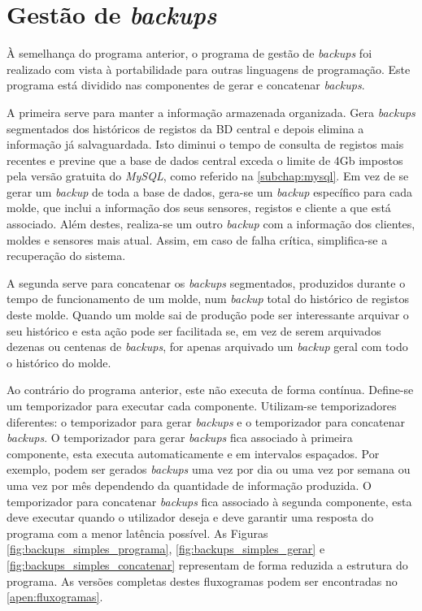 \documentclass[11pt,twoside,a4paper]{report}
\begin{document}
\section{Gestão de \textit{backups}}
\label{subchap:backups}
À semelhança do programa anterior, o programa de gestão de \textit{backups} foi realizado com vista à portabilidade para outras linguagens de programação. Este programa está dividido nas componentes de gerar e concatenar \textit{backups}.\par 
A primeira serve para manter a informação armazenada organizada. Gera \textit{backups} segmentados dos históricos de registos da BD central e depois elimina a informação já salvaguardada. Isto diminui o tempo de consulta de registos mais recentes e previne que a base de dados central exceda o limite de 4Gb impostos pela versão gratuita do \textit{MySQL}, como referido na \autoref{subchap:mysql}. Em vez de se gerar um \textit{backup} de toda a base de dados, gera-se um \textit{backup} específico para cada molde, que inclui a informação dos seus sensores, registos e cliente a que está associado. Além destes, realiza-se um outro \textit{backup} com a informação dos clientes, moldes e sensores mais atual. Assim, em caso de falha crítica, simplifica-se a recuperação do sistema.\par 
A segunda serve para concatenar os \textit{backups} segmentados, produzidos durante o tempo de funcionamento de um molde, num \textit{backup} total do histórico de registos deste molde. Quando um molde sai de produção pode ser interessante arquivar o seu histórico e esta ação pode ser facilitada se, em vez de serem arquivados dezenas ou centenas de \textit{backups}, for apenas arquivado um \textit{backup} geral com todo o histórico do molde.\par 
Ao contrário do programa anterior, este não executa de forma contínua. Define-se um temporizador para executar cada componente. Utilizam-se temporizadores diferentes: o temporizador para gerar \textit{backups} e o temporizador para concatenar \textit{backups}. O temporizador para gerar \textit{backups} fica associado à primeira componente, esta executa automaticamente e em intervalos espaçados. Por exemplo, podem ser gerados \textit{backups} uma vez por dia ou uma vez por semana ou uma vez por mês dependendo da quantidade de informação produzida. O temporizador para concatenar \textit{backups} fica associado à segunda componente, esta deve executar quando o utilizador deseja e deve garantir uma resposta do programa com a menor latência possível.
As Figuras \ref{fig:backups_simples_programa}, \ref{fig:backups_simples_gerar} e \ref{fig:backups_simples_concatenar} representam de forma reduzida a estrutura do programa. As versões completas destes fluxogramas podem ser encontradas no \autoref{apen:fluxogramas}.\par 
\end{document}
